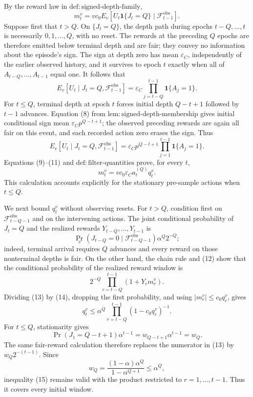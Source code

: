 By the reward law in \(\mathrm{def{:}signed\text{-}depth\text{-}family}\),
\[
 m_t^v=vc_0E_v[U_t\mathbf1\{J_t=Q\}\mid\mathcal F_{t-1}^{\mathrm{obs}}]. \tag{9}
\]
Suppose first that \(t>Q\).  On \(\{J_t=Q\}\), the depth path during epochs \(t-Q,\ldots,t\) is necessarily \(0,1,\ldots,Q\), with no reset.  The rewards at the preceding \(Q\) epochs are therefore emitted below terminal depth and are fair; they convey no information about the episode's sign.  The sign at depth zero has mean \(\varepsilon_C\), independently of the earlier observed history, and it survives to epoch \(t\) exactly when all of \(A_{t-Q},\ldots,A_{t-1}\) equal one.  It follows that
\[
 E_v[U_t\mid J_t=Q,\mathcal F_{t-1}^{\mathrm{obs}}]
 =\varepsilon_C\prod_{j=t-Q}^{t-1}\mathbf1\{A_j=1\}. \tag{10}
\]
For \(t\le Q\), terminal depth at epoch \(t\) forces initial depth \(Q-t+1\) followed by \(t-1\) advances.  Equation (8) from \(\mathrm{lem{:}signed\text{-}depth\text{-}membership}\) gives initial conditional sign mean \(\varepsilon_Cp^{Q-t+1}\); the observed preceding rewards are again all fair on this event, and each recorded action zero erases the sign.  Thus
\[
 E_v[U_t\mid J_t=Q,\mathcal F_{t-1}^{\mathrm{obs}}]
 =\varepsilon_Cp^{Q-t+1}\prod_{j=1}^{t-1}\mathbf1\{A_j=1\}. \tag{11}
\]
Equations (9)--(11) and \(\mathrm{def{:}filter\text{-}quantities}\) prove, for every \(t\),
\[
 m_t^v=vc_0\varepsilon_Ca_t^{(Q)}q_t^v. \tag{12}
\]
This calculation accounts explicitly for the stationary pre-sample actions when \(t\le Q\).

We next bound \(q_t^v\) without observing resets.  For \(t>Q\), condition first on \(\mathcal F_{t-Q-1}^{\mathrm{obs}}\) and on the intervening actions.  The joint conditional probability of \(J_t=Q\) and the realized rewards \(Y_{t-Q},\ldots,Y_{t-1}\) is
\[
 \Pr_v(J_{t-Q}=0\mid\mathcal F_{t-Q-1}^{\mathrm{obs}})\alpha^Q2^{-Q}; \tag{13}
\]
indeed, terminal arrival requires \(Q\) advances and every reward on those nonterminal depths is fair.  On the other hand, the chain rule and (12) show that the conditional probability of the realized reward window is
\[
 2^{-Q}\prod_{r=t-Q}^{t-1}(1+Y_rm_r^v). \tag{14}
\]
Dividing (13) by (14), dropping the first probability, and using
\(|m_r^v|\le c_0q_r^v\), gives
\[
 q_t^v\le\alpha^Q\prod_{r=t-Q}^{t-1}(1-c_0q_r^v)^{-1}. \tag{15}
\]
For \(t\le Q\), stationarity gives
\[
 \Pr(J_1=Q-t+1)\alpha^{t-1}=w_{Q-t+1}\alpha^{t-1}=w_Q.
\]
The same fair-reward calculation therefore replaces the numerator in (13) by \(w_Q2^{-(t-1)}\).  Since
\[
 w_Q=\frac{(1-\alpha)\alpha^Q}{1-\alpha^{Q+1}}\le\alpha^Q,
\]
inequality (15) remains valid with the product restricted to \(r=1,\ldots,t-1\).  Thus it covers every initial window.

